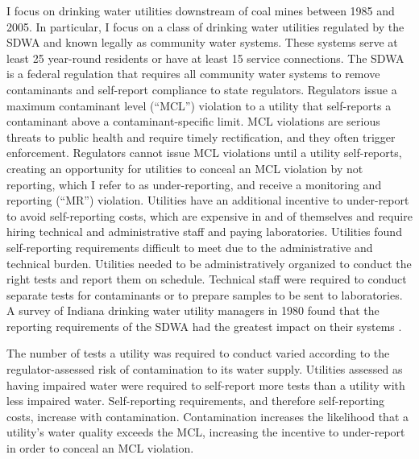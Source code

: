 \documentclass[12pt]{article}
\begin{document}
I focus on drinking water utilities downstream of coal mines between 1985 and 2005. In particular, I focus on a class of drinking water utilities regulated by the SDWA and known legally as community water systems. These systems serve at least 25 year-round residents or have at least 15 service connections. The SDWA is a federal regulation that requires all community water systems to remove contaminants and self-report compliance to state regulators. Regulators issue a maximum contaminant level (``MCL'') violation to a utility that self-reports a contaminant above a contaminant-specific limit. MCL violations are serious threats to public health and require timely rectification, and they often trigger enforcement. Regulators cannot issue MCL violations until a utility self-reports, creating an opportunity for utilities to conceal an MCL violation by not reporting, which I refer to as under-reporting, and receive a monitoring and reporting (``MR'') violation. Utilities have an additional incentive to under-report to avoid self-reporting costs, which are expensive in and of themselves and require hiring technical and administrative staff and paying laboratories. Utilities found self-reporting requirements difficult to meet due to the administrative and technical burden. Utilities needed to be administratively organized to conduct the right tests and report them on schedule. Technical staff were required to conduct separate tests for contaminants or to prepare samples to be sent to laboratories. A survey of Indiana drinking water utility managers in 1980 found that the reporting requirements of the SDWA had the greatest impact on their systems \parencite{oleckno1982national}. 

The number of tests a utility was required to conduct varied according to the regulator-assessed risk of contamination to its water supply. Utilities assessed as having impaired water were required to self-report more tests than a utility with less impaired water. Self-reporting requirements, and therefore self-reporting costs, increase with contamination. Contamination increases the likelihood that a utility's water quality exceeds the MCL, increasing the incentive to under-report in order to conceal an MCL violation.

\end{document}
